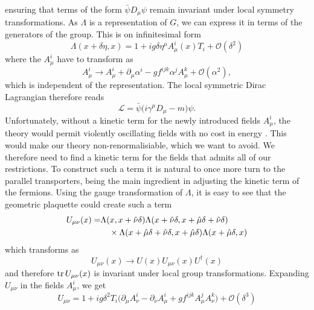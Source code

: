 %
ensuring that terms of the form $\bar{\psi} D_{\mu} \psi$ remain invariant under
local symmetry transformations. As $\Lambda$ is a representation of $G$, we can
express it in terms of the generators of the group. This is on infinitesimal
form
%
\begin{equation}
  \Lambda(x + \delta\eta,x) = 1 + i g \delta \eta^{\mu} A^i_{\mu}(x) T_i +
    \mathcal{O}(\delta^2)
\end{equation}
%
where the $A^i_{\mu}$ have to transform as
%
\begin{equation}
  A^i_{\mu} \to A^i_{\mu} + \partial_{\mu} \alpha^i - g f^{ijk} \alpha^j A^k_{\mu}
    + \mathcal{O}(\alpha^2),
\end{equation}
%
which is independent of the representation. The local symmetric Dirac
Lagrangian therefore reads
%
\begin{equation}
  \mathcal{L} = \bar{\psi}\big(i \gamma^{\mu} D_{\mu} - m\big) \psi.
\end{equation}
%
Unfortunately, without a kinetic term for the newly introduced fields
$A^i_{\mu}$, the theory would permit violently oscillating fields with no cost
in energy \citep{tHooft:2002zz}. This would make our theory non-renormalisiable,
which we want to avoid.  We therefore need to find a kinetic term for the fields
that admits all of our restrictions. To construct such a term it is natural to
once more turn to the parallel transporters, being the main ingredient in
adjusting the kinetic term of the fermions. Using the gauge transformation of
$\Lambda$, it is easy to see that the geometric plaquette could create such a
term
%
\begin{align} \label{eq:transport_plaquette}
  U_{\mu\nu}(x) =& \Lambda(x, x + \hat{\nu} \delta)
    \Lambda(x + \hat{\nu} \delta, x + \hat{\mu} \delta + \hat{\nu} \delta) \nonumber\\
    &\hskip1em\times\Lambda(x + \hat{\mu} \delta + \hat{\nu}\delta, x + \hat{\mu} \delta)
    \Lambda(x + \hat{\mu}\delta, x)
\end{align}
%
which transforms as
%
\begin{equation}
  U_{\mu\nu}(x) \to U(x) U_{\mu\nu}(x) U^{\dagger}(x)
\end{equation}
%
and therefore $\operatorname{tr} U_{\mu\nu}(x)$ is invariant under local group
transformations. Expanding $U_{\mu\nu}$ in the fields $A^i_{\mu}$, we get
%
\begin{equation}
  U_{\mu\nu} = 1 + i g \delta^2 T_i \big( \partial_{\mu} A^i_{\nu} - \partial_{\nu}
  A^i_{\mu} + g f^{ijk} A^j_{\mu} A^k_{\nu} \big) + \mathcal{O}(\delta^3)
\end{equation}
